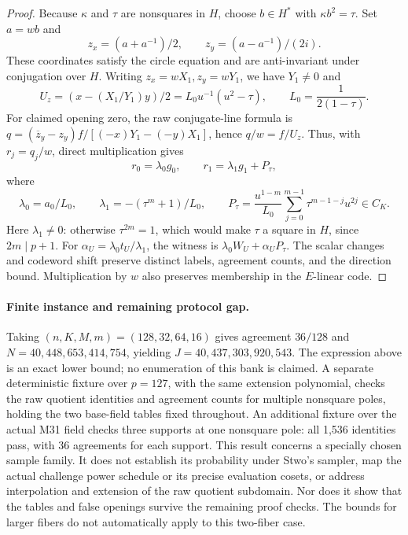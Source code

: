 \documentclass[11pt,letterpaper]{article}
\theoremstyle{definition}
\theoremstyle{remark}
\begin{document}
\begin{proof}
Because $\kappa$ and $\tau$ are nonsquares in $H$, choose $b\in H^*$
with $\kappa b^2=\tau$. Set $a=wb$ and
\[
 z_x=(a+a^{-1})/2,\qquad z_y=(a-a^{-1})/(2i).
\]
These coordinates satisfy the circle equation and are anti-invariant
under conjugation over $H$. Writing $z_x=wX_1,z_y=wY_1$, we have
$Y_1\ne0$ and
\[
 U_z=(x-(X_1/Y_1)y)/2
     =L_0u^{-1}(u^2-\tau),\qquad L_0=\frac1{2(1-\tau)}.
\]
For claimed opening zero, the raw conjugate-line formula is
$q=(\overline z_y-z_y)f/[(-x)Y_1-(-y)X_1]$, hence $q/w=f/U_z$.
Thus, with $r_j=q_j/w$, direct multiplication gives
\[
 r_0=\lambda_0g_0,\qquad r_1=\lambda_1g_1+P_\tau,
\]
where
\[
 \lambda_0=a_0/L_0,\qquad \lambda_1=-(\tau^m+1)/L_0,
 \qquad
 P_\tau=\frac{u^{1-m}}{L_0}
       \sum_{j=0}^{m-1}\tau^{m-1-j}u^{2j}\in C_K.
\]
Here $\lambda_1\ne0$: otherwise $\tau^{2m}=1$, which would make
$\tau$ a square in $H$, since $2m\mid p+1$.
For $\alpha_U=\lambda_0t_U/\lambda_1$, the witness is
$\lambda_0W_U+\alpha_UP_\tau$. The scalar changes and codeword shift
preserve distinct labels, agreement counts, and the direction bound.
Multiplication by $w$ also preserves membership in the $E$-linear code.
\end{proof}

\paragraph{Finite instance and remaining protocol gap.}
Taking $(n,K,M,m)=(128,32,64,16)$ gives agreement $36/128$ and
$N=40{,}448{,}653{,}414{,}754$, yielding
$J=40{,}437{,}303{,}920{,}543$. The expression above is an exact lower
bound; no enumeration of this bank is claimed. A separate deterministic
fixture over $p=127$, with the same extension polynomial, checks the
raw quotient identities and agreement counts for multiple nonsquare
poles, holding the two base-field tables fixed throughout. An additional fixture
over the actual M31 field checks three supports at one nonsquare pole:
all 1,536 identities pass, with 36 agreements for each support.
This result concerns a specially chosen sample family. It does not
establish its probability under Stwo's sampler, map the actual challenge
power schedule or its precise evaluation cosets, or address interpolation and extension of the raw
quotient subdomain. Nor does it show that the tables and false openings
survive the remaining proof checks. The bounds for larger fibers do
not automatically apply to this two-fiber case.
\end{document}
